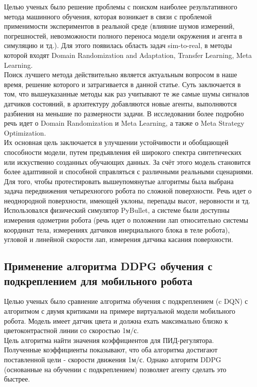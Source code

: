 \documentclass[12 pt, a4paper]{article}
\theoremstyle{definition}
\theoremstyle{plain}
\theoremstyle{remark}
\begin{document}
Целью ученых было решение проблемы с поиском наиболее результативного метода машинного обучения, которая возникает в связи с проблемой применимости экспериментов в реальной среде (влияние шумов измерений, погрешностей, невозможности полного переноса модели окружения и агента в симуляцию и тд.). Для этого появилась область задач sim-to-real, в методы которой входят Domain Randomization and Adaptation, Transfer Learning, Meta Learning.\\

Поиск лучшего метода действительно является актуальным вопросом в наше время, решение которого и затрагивается в данной статье. Суть заключается в том, что вышеуказанные методы как раз учитывают те же самые шумы сигналов датчиков состояний, в архитектуру добавляются новые агенты, выполняются разбиения на меньшие по размерности задачи. В исследовании более подробно речь идет о Domain Randomization и Meta Learning, а также о Meta Strategy Optimization. \\

Их основная цель заключается в улучшении устойчивости и обобщающей способности модели, путем предъявления ей широкого спектра синтетических или искуственно созданных обучающих данных. За счёт этого модель становится более адаптивной и способной справляться с различными реальными сценариями.\\

Для того, чтобы протестировать вышеупомянутые алгоритмы была выбрана задача передвижения четырехногого робота по сложной поверхности. Речь идет о неоднородной поверхности, имеющей уклоны, перепады высот, неровности и тд. Использовался физический симулятор PyBullet, а системе были доступны измерения одометрии робота (речь идет о положении лап относительно системы координат тела, измерениях датчиков инерциального блока в теле робота), угловой и линейной скорости лап, измерения датчика касания поверхности. \\


\subsection{Применение алгоритма DDPG обучения с подкреплением для мобильного робота \cite{litlink7}}
Целью ученых было сравнение алгоритма обучения с подкреплением (c DQN) с алгоритмом с двумя критиками на примере виртуальной модели мобильного робота. Модель имеет датчик цвета и должна ехать максимально близко к цветоконтрастной линии со скоростью 1м/с. \\
Цель алгоритма найти значения коэффициентов для ПИД-регулятора.\\
Полученные коэффициенты показывают, что оба алгоритма достигают поставленной цели - скорости движения 1м/с. Однако алгоритм DDPG (основанные на обучении с подкреплением) позволяет агенту сделать это быстрее.
\end{document}
